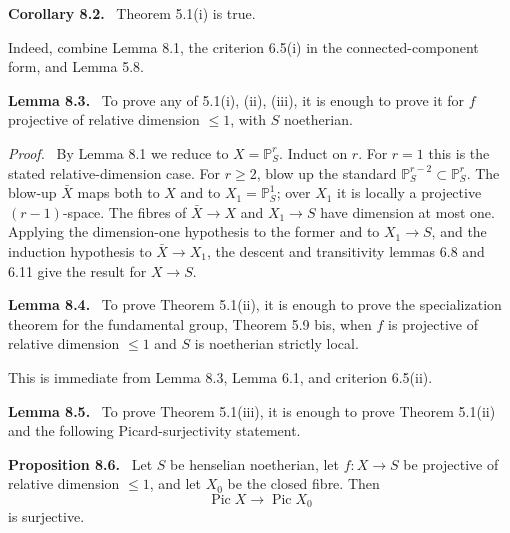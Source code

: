 \documentclass[12pt]{article}
\newcommand{\Pic}{\operatorname{Pic}}
\newenvironment{statement}[1]{\par\medskip\noindent\textbf{#1.}\ }{\par\medskip}
\newenvironment{prooftext}[1][Proof]{\par\noindent\emph{#1.}\ }{\par\medskip}
\begin{document}
\begin{statement}{Corollary 8.2}
Theorem 5.1(i) is true.
\end{statement}

Indeed, combine Lemma 8.1, the criterion 6.5(i) in the connected-component form, and Lemma 5.8.

\begin{statement}{Lemma 8.3}
To prove any of 5.1(i), (ii), (iii), it is enough to prove it for \(f\) projective of relative dimension \(\le1\), with \(S\) noetherian.
\end{statement}

\begin{prooftext}
By Lemma 8.1 we reduce to \(X=\mathbb P^r_S\). Induct on \(r\). For \(r=1\) this is the stated relative-dimension case. For \(r\ge2\), blow up the standard \(\mathbb P^{r-2}_S\subset\mathbb P^r_S\). The blow-up \(\bar X\) maps both to \(X\) and to \(X_1=\mathbb P^1_S\); over \(X_1\) it is locally a projective \((r-1)\)-space. The fibres of \(\bar X\to X\) and \(X_1\to S\) have dimension at most one. Applying the dimension-one hypothesis to the former and to \(X_1\to S\), and the induction hypothesis to \(\bar X\to X_1\), the descent and transitivity lemmas 6.8 and 6.11 give the result for \(X\to S\).
\end{prooftext}

\begin{statement}{Lemma 8.4}
To prove Theorem 5.1(ii), it is enough to prove the specialization theorem for the fundamental group, Theorem 5.9 bis, when \(f\) is projective of relative dimension \(\le1\) and \(S\) is noetherian strictly local.
\end{statement}

This is immediate from Lemma 8.3, Lemma 6.1, and criterion 6.5(ii).

\begin{statement}{Lemma 8.5}
To prove Theorem 5.1(iii), it is enough to prove Theorem 5.1(ii) and the following Picard-surjectivity statement.
\end{statement}

\begin{statement}{Proposition 8.6}
Let \(S\) be henselian noetherian, let \(f:X\to S\) be projective of relative dimension \(\le1\), and let \(X_0\) be the closed fibre. Then
\[
\Pic X\longrightarrow \Pic X_0
\]
is surjective.
\end{statement}
\end{document}
